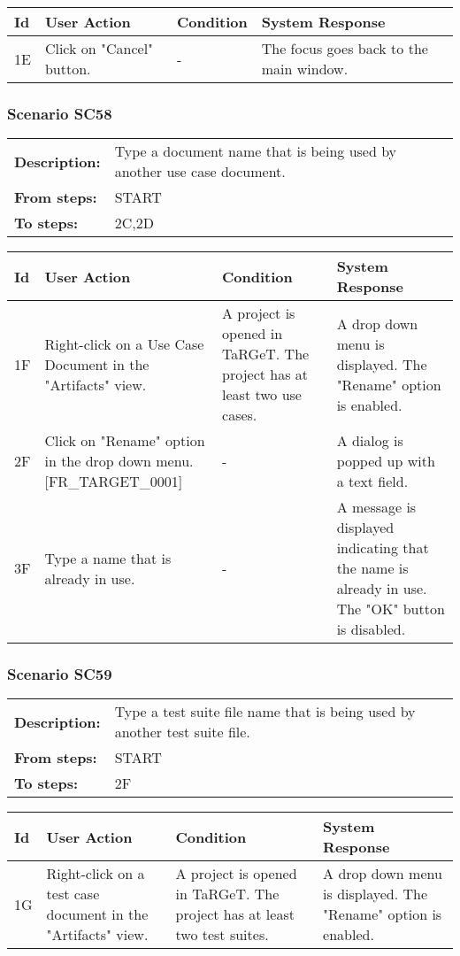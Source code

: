 \documentclass[a4paper,11pt]{article}
\newcommand{\bl}{\\ \hline}
\begin{document}
\begin{tabular}{|p{0.8in}|p{1.6in}|p{1.6in}|p{1.6in}|}
\hline
Id & User Action & Condition & System Response  \bl 
1E & Click on "Cancel" button. & - & The focus goes back to the main window. \bl 
\end{tabular}
\subsubsection*{Scenario SC58}
\begin{tabular}{p{1in}p{4in}}
{\bf Description:} & Type a document name that is being used by another use
					case document. \\
{\bf From steps:} & START \\
{\bf To steps:} & 2C,2D \\
\end{tabular}
 
\begin{tabular}{|p{0.8in}|p{1.6in}|p{1.6in}|p{1.6in}|}
\hline
Id & User Action & Condition & System Response  \bl 
1F & Right-click on a Use Case Document in the "Artifacts" view.
					 & A project is opened in TaRGeT. The project has at least
						two use cases. & A drop down menu is displayed. The "Rename" option is
						enabled. \bl 
2F & Click on "Rename" option in the drop down menu.
						[FR_TARGET_0001] & - & A dialog is popped up with a text field. \bl 
3F & Type a name that is already in use. & - & A message is displayed indicating that the name is
						already in use. The "OK" button is disabled. \bl 
\end{tabular}
\subsubsection*{Scenario SC59}
\begin{tabular}{p{1in}p{4in}}
{\bf Description:} & Type a test suite file name that is being used by
					another test suite file. \\
{\bf From steps:} & START \\
{\bf To steps:} & 2F \\
\end{tabular}
 
\begin{tabular}{|p{0.8in}|p{1.6in}|p{1.6in}|p{1.6in}|}
\hline
Id & User Action & Condition & System Response  \bl 
1G & Right-click on a test case document in the "Artifacts"
						view.  & A project is opened in TaRGeT. The project has at least
						two test suites. & A drop down menu is displayed. The "Rename" option is
						enabled. \bl 
\end{tabular}
\end{document}
